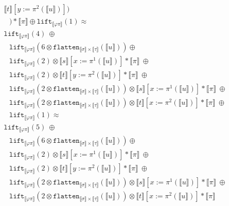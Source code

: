 \documentclass[a4paper,UKenglish,cleveref,autoref,numberwithinsect]{lipics-v2019}
\theoremstyle{definition}
\newcommand{\flatten}{\mathtt{flatten}}
\newcommand{\lift}{\mathtt{lift}}
\newcommand{\typeinterpret}[1]{\llbracket #1 \rrbracket}
\newcommand{\interpret}[1]{\llbracket #1 \rrbracket}
\begin{document}
\begin{itemize}
\[\begin{array}{l}
      \interpret{t}[y:=\pi^2(\interpret{u})]) \\
  \phantom{A}) * \typeinterpret{\pi} \oplus
  \lift_{\typeinterpret{\varphi\pi}}(1) \approx \\
  \lift_{\typeinterpret{\varphi\pi}}(4)\ \oplus \\
  \phantom{A}
  \lift_{\typeinterpret{\varphi\pi}}(6 \otimes
      \flatten_{\typeinterpret{\sigma} \times \typeinterpret{\tau}}(
      \interpret{u})) \oplus \\
  \phantom{A}
  \lift_{\typeinterpret{\varphi\pi}}(2) \otimes
    \interpret{s}[x:=\pi^1(\interpret{u})] * \typeinterpret{\pi}\ \oplus\\
  \phantom{A}
  \lift_{\typeinterpret{\varphi\pi}}(2) \otimes
    \interpret{t}[y:=\pi^2(\interpret{u})] * \typeinterpret{\pi}\ \oplus\\
  \phantom{A}
  \lift_{\typeinterpret{\varphi\pi}}(2 \otimes
    \flatten_{\typeinterpret{\sigma} \times \typeinterpret{\tau}}(
      \interpret{u})) \otimes \interpret{s}[x:=\pi^1(\interpret{u})]
      * \typeinterpret{\pi}\ \oplus \\
  \phantom{A}
  \lift_{\typeinterpret{\varphi\pi}}(2 \otimes
    \flatten_{\typeinterpret{\sigma} \times \typeinterpret{\tau}}(
      \interpret{u})) \otimes \interpret{t}[x:=\pi^2(\interpret{u})]
      * \typeinterpret{\pi}\ \oplus \\
  \phantom{A}
  \lift_{\typeinterpret{\varphi\pi}}(1) \approx \\
  \lift_{\typeinterpret{\varphi\pi}}(5)\ \oplus \\
  \phantom{A}
  \lift_{\typeinterpret{\varphi\pi}}(6 \otimes
      \flatten_{\typeinterpret{\sigma} \times \typeinterpret{\tau}}(
      \interpret{u})) \oplus \\
  \phantom{A}
  \lift_{\typeinterpret{\varphi\pi}}(2) \otimes
    \interpret{s}[x:=\pi^1(\interpret{u})] * \typeinterpret{\pi}\ \oplus\\
  \phantom{A}
  \lift_{\typeinterpret{\varphi\pi}}(2) \otimes
    \interpret{t}[y:=\pi^2(\interpret{u})] * \typeinterpret{\pi}\ \oplus\\
  \phantom{A}
  \lift_{\typeinterpret{\varphi\pi}}(2 \otimes
    \flatten_{\typeinterpret{\sigma} \times \typeinterpret{\tau}}(
      \interpret{u})) \otimes \interpret{s}[x:=\pi^1(\interpret{u})]
      * \typeinterpret{\pi}\ \oplus \\
  \phantom{A}
  \lift_{\typeinterpret{\varphi\pi}}(2 \otimes
    \flatten_{\typeinterpret{\sigma} \times \typeinterpret{\tau}}(
      \interpret{u})) \otimes \interpret{t}[x:=\pi^2(\interpret{u})]
      * \typeinterpret{\pi} \\
  \end{array}
  \]


\end{itemize}
\end{document}
